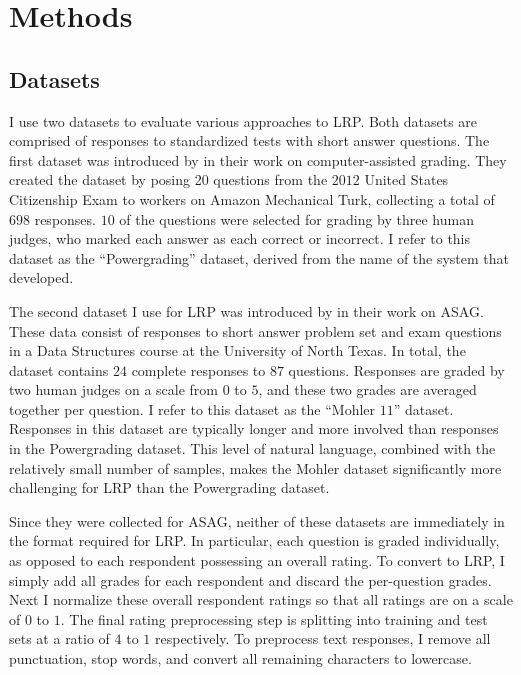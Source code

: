 \section{Methods}
\subsection{Datasets}
I use two datasets to evaluate various approaches to LRP. Both datasets are comprised of responses to standardized tests with short answer questions. The first dataset was introduced by \citet{basu2013powergrading} in their work on computer-assisted grading. They created the dataset by posing 20 questions from the $2012$ United States Citizenship Exam to workers on Amazon Mechanical Turk, collecting a total of $698$ responses. $10$ of the questions were selected for grading by three human judges, who marked each answer as each correct or incorrect. I refer to this dataset as the ``Powergrading'' dataset, derived from the name of the system that  \citet{basu2013powergrading} developed.

The second dataset I use for LRP was introduced by \citet{mohler2011learning} in their work on ASAG. These data consist of responses to short answer problem set and exam questions in a Data Structures course at the University of North Texas. In total, the dataset contains $24$ complete responses to $87$ questions. Responses are graded by two human judges on a scale from $0$ to $5$, and these two grades are averaged together per question. I refer to this dataset as the ``Mohler $11$'' dataset. Responses in this dataset are typically longer and more involved than responses in the Powergrading dataset. This level of natural language, combined with the relatively small number of samples, makes the Mohler dataset significantly more challenging for LRP than the Powergrading dataset.

Since they were collected for ASAG, neither of these datasets are immediately in the format required for LRP. In particular, each question is graded individually, as opposed to each respondent possessing an overall rating. To convert to LRP, I simply add all grades for each respondent and discard the per-question grades. Next I normalize these overall respondent ratings so that all ratings are on a scale of $0$ to $1$. The final rating preprocessing step is splitting into training and test sets at a ratio of $4$ to $1$ respectively. To preprocess text responses, I remove all punctuation, stop words, and convert all remaining characters to lowercase.

